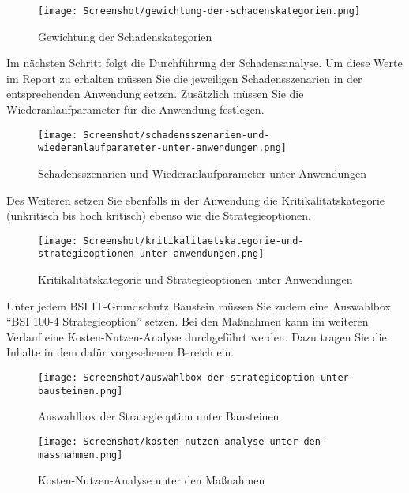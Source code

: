 \documentclass[a4paper,10pt]{book}
\begin{document}
\begin{figure}[htb!]
  \centering
  \texttt{[image: Screenshot/gewichtung-der-schadenskategorien.png]}
  \caption{Gewichtung der Schadenskategorien}
  \label{fig:gewichtung-der-schadenskategorien}
\end{figure}

Im nächsten Schritt folgt die Durchführung der Schadensanalyse. Um diese Werte
im Report zu erhalten müssen Sie die jeweiligen Schadensszenarien in der
entsprechenden Anwendung setzen. Zusätzlich müssen Sie die
Wiederanlaufparameter für die Anwendung festlegen.

\begin{figure}[htb!]
  \centering
  \texttt{[image: Screenshot/schadensszenarien-und-wiederanlaufparameter-unter-anwendungen.png]}
  \caption{Schadensszenarien und Wiederanlaufparameter unter Anwendungen}
  \label{fig:schadensszenarien-und-wiederanlaufparameter-unter-anwendungen}
\end{figure}

Des Weiteren setzen Sie ebenfalls in der Anwendung die Kritikalitätskategorie
(unkritisch bis hoch kritisch) ebenso wie die Strategieoptionen.

\begin{figure}[htb!]
  \centering
  \texttt{[image: Screenshot/kritikalitaetskategorie-und-strategieoptionen-unter-anwendungen.png]}
  \caption{Kritikalitätskategorie und Strategieoptionen unter Anwendungen}
  \label{fig:kritikalitaetskategorie-und-strategieoptionen-unter-anwendungen}
\end{figure}

Unter jedem BSI IT-Grundschutz Baustein müssen Sie zudem eine Auswahlbox "`BSI
100-4 Strategieoption"' setzen. Bei den Maßnahmen kann im weiteren Verlauf eine
Kosten-Nutzen-Analyse durchgeführt werden. Dazu tragen Sie die Inhalte in dem
dafür vorgesehenen Bereich ein.

\begin{figure}[htb!]
  \centering
  \texttt{[image: Screenshot/auswahlbox-der-strategieoption-unter-bausteinen.png]}
  \caption{Auswahlbox der Strategieoption unter Bausteinen}
  \label{fig:auswahlbox-der-strategieoption-unter-bausteinen}
\end{figure}

\begin{figure}[htb!]
  \centering
  \texttt{[image: Screenshot/kosten-nutzen-analyse-unter-den-massnahmen.png]}
  \caption{Kosten-Nutzen-Analyse unter den Maßnahmen}
  \label{fig:kosten-nutzen-analyse-unter-den-massnahmen}
\end{figure}
\end{document}
